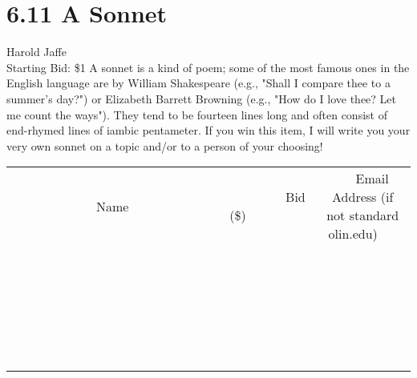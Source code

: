 \documentclass[11pt]{article}
\begin{document}
\section*{6.11 A Sonnet}
Harold Jaffe
\\
Starting Bid: \$1
\newline
A sonnet is a kind of poem; some of the most famous ones in the English language are by William Shakespeare (e.g., "Shall I compare thee to a summer's day?") or Elizabeth Barrett Browning (e.g., "How do I love thee? Let me count the ways"). They tend to be fourteen lines long and often consist of end-rhymed lines of iambic pentameter. If you win this item, I will write you your very own sonnet on a topic and/or to a person of your choosing!
\\[6ex]
\begin{tabular}{c c c}
~~~~~~~~~~~~~Name~~~~~~~~~~~~~ & ~~~~~~~~~Bid (\$)~~~~~~~~~  & ~~~Email Address (if not standard olin.edu)~~~\\
 & & \\
\hline
 & & \\
\hline
 & & \\
\hline
 & & \\
\hline
 & & \\
\hline
 & & \\
\hline
 & & \\
\hline
 & & \\
\hline
 & & \\
\hline
 & & \\
\hline
 & & \\
\hline
 & & \\
\hline
 & & \\
\hline
 & & \\
\hline
 & & \\
\hline
 & & \\
\hline
 & & \\
\hline
 & & \\
\hline
 & & \\
\hline
 & & \\
\hline
 & & \\
\hline
 & & \\
\hline
 & & \\
\hline
 & & \\
\hline
 & & \\
\hline
 & & \\
\hline
\end{tabular}
\newpage
\end{document}
